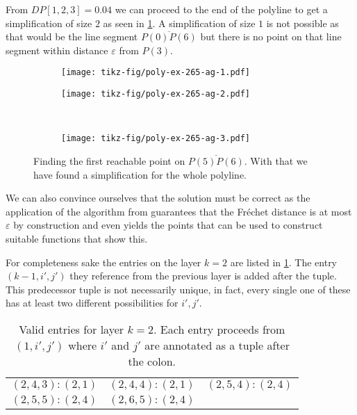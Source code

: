 From \(DP[1,2,3] = 0.04\) we can proceed to the end of the polyline to get a simplification of size \(2\) as seen in \cref{fig:poly-ex-265-ag}. A simplification of size \(1\) is not possible as that would be the line segment \(\overline{P(0)P(6)}\) but there is no point on that line segment within distance \(\varepsilon\) from \(P(3)\). 

\begin{figure}
  \centering
  \begin{subfigure}[b]{0.4\textwidth}
    \texttt{[image: tikz-fig/poly-ex-265-ag-1.pdf]}
  \end{subfigure}
  \begin{subfigure}[b]{0.4\textwidth}
    \texttt{[image: tikz-fig/poly-ex-265-ag-2.pdf]}
  \end{subfigure}\\
  \begin{subfigure}[b]{0.4\textwidth}
    \texttt{[image: tikz-fig/poly-ex-265-ag-3.pdf]}
  \end{subfigure}
  \caption{Finding the first reachable point on \(\overline{P(5)P(6)}\). With that we have found a simplification for the whole polyline.}
  \label{fig:poly-ex-265-ag}
\end{figure}

We can also convince ourselves that the solution must be correct as the application of the algorithm from \citeauthor{computing_the_frechet_distance_between_two_polygonal_curves} guarantees that the Fréchet distance is at most \(\varepsilon\) by construction and even yields the points that can be used to construct suitable functions that show this. 

For completeness sake the entries on the layer \(k = 2\) are listed in \cref{tab:exlayer2}. The entry \((k - 1, i', j')\) they reference from the previous layer is added after the tuple. This predecessor tuple is not necessarily unique, in fact, every single one of these has at least two different possibilities for \(i', j'\).
\begin{table}[ht]
\centering
\begin{tabular}{|ccc|}
\hline
$(2,4,3):(2, 1)$ & $(2,4,4):(2, 1)$ & $(2,5,4):(2,4)$ \\
$(2,5,5):(2,4)$ & $(2,6,5):(2,4)$ & \\
\hline
\end{tabular}
	\caption{Valid entries for layer \(k = 2\). Each entry proceeds from \((1, i', j')\) where \(i'\) and \(j'\) are annotated as a tuple after the colon.}
\label{tab:exlayer2}
\end{table}

